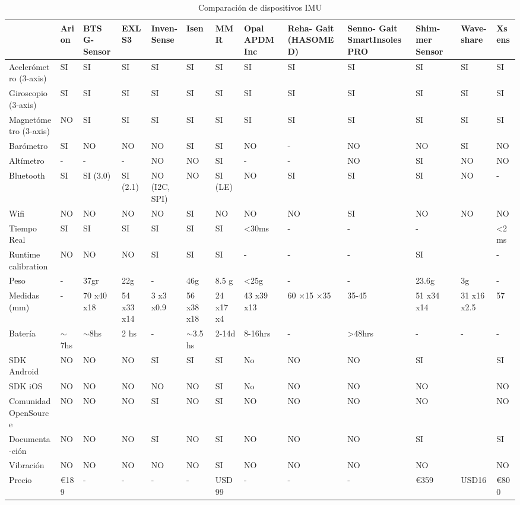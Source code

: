 \begin{table}[!h]
\caption{Comparación de dispositivos IMU}
\label{tab:imus}
\centering
\hspace*{-3.5cm}%
\begin{tabular}{p{2cm}|p{0.8cm}|p{0.8cm}|p{1cm}|p{1cm}|p{1cm}|p{1cm}|p{1cm}|p{1.2cm}|p{1cm}|p{1cm}|p{1cm}|p{0.8cm}}
 & Arion & BTS G-Sensor & EXL S3 & Inven- Sense & Isen & MMR & Opal APDM Inc & Reha- Gait (HASOMED) & Senno- Gait SmartInsolesPRO & Shim- mer Sensor & Wave- share & Xsens   \\ \hline
Acelerómetro (3-axis) & SI & SI & SI & SI & SI & SI & SI & SI & SI & SI & SI & SI \\ \hline
Giroscopio (3-axis) & SI & SI & SI & SI & SI & SI & SI & SI & SI & SI & SI & SI \\\hline
Magnetómetro (3-axis) & NO & SI & SI & SI & SI & SI & SI & SI & SI & SI & SI & SI \\ \hline
Barómetro & SI & NO & NO & NO & SI & SI & NO & - & NO & NO & SI & NO \\ \hline
Altímetro & - & - & - & NO & NO & SI & - & - & NO & SI & NO & NO \\ \hline
Bluetooth & SI & SI (3.0) & SI (2.1) & NO (I2C, SPI) & NO & SI (LE) & NO & SI & SI & SI & NO & - \\ \hline
Wifi & NO & NO & NO & NO & SI & NO & NO & NO & SI & NO & NO & NO \\ \hline
Tiempo Real & SI & SI & SI & SI & SI & SI & \textless 30ms & - & - & - &  & \textless 2 ms \\ \hline
Runtime calibration & NO & NO & NO & SI & SI & SI & - & - & - & SI &  & - \\ \hline
Peso & - & 37gr & 22g & - & 46g & 8.5 g & \textless 25g & - & - & 23.6g & 3g & - \\ \hline
Medidas (mm) & - & 70 x40 x18 & 54 x33 x14 & 3 x3 x0.9 & 56 x38 x18 & 24 x17 x4 & 43 x39 x13 & 60 ×15 ×35 & 35-45 & 51 x34 x14 & 31 x16 x2.5 & 57 \\ \hline
Batería & $\sim$7hs & $\sim$8hs & 2 hs & - & $\sim$3.5 hs & 2-14d & 8-16hrs & - & \textgreater{}48hrs & - & - & - \\ \hline
SDK Android & NO & NO & NO & SI & SI & SI & No & NO & NO & SI &  & SI \\ \hline
SDK iOS & NO & NO & NO & NO & NO & SI & No & NO & NO & NO &  & NO \\ \hline
Comunidad OpenSource & NO & NO & NO & SI & NO & SI & NO & NO & NO & NO &  & NO \\\hline
Documenta-ción & NO & NO & NO & SI & NO & SI & NO & NO & NO & SI &  & SI \\ \hline
Vibración & NO & NO & NO & NO & NO & SI & NO & NO & NO & NO &  & NO \\ \hline
Precio & \euro 189 & - & - & - & - & USD99 & - & - & - & \euro 359 & USD16 & \euro 800 \\ \hline
\end{tabular}
\hspace*{-3.5cm}%
\end{table}

